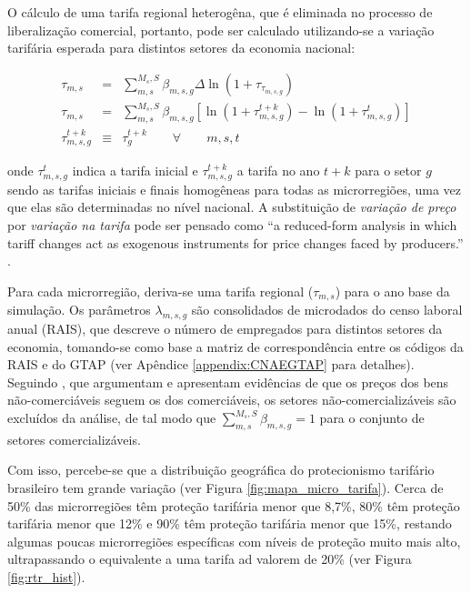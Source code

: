 \documentclass{article}
\begin{document}
O cálculo de uma tarifa regional heterogêna, que é eliminada no processo de liberalização comercial, portanto, pode ser calculado utilizando-se a variação tarifária esperada para  distintos setores da economia nacional:

\begin{eqnarray}
    \label{eq:reg_tar}
    \tau_{m,s} &=& \sum_{m,s}^{M_s,S} \beta_{m,s,g} \Delta \ln(1+\tau_\tau_{m,s,g}) \nonumber \\
    \tau_{m,s} &=& \sum_{m,s}^{M_s,S} \beta_{m,s,g} [\ln (1 + \tau_{m,s,g}^{t+k}) - \ln (1 + \tau_{m,s,g}^{t})] \\
    \tau_{m,s,g}^{t+k} &\equiv& \tau_{g}^{t+k} \qquad \forall \qquad m,s,t \nonumber 
\end{eqnarray}


onde \(\tau_{m,s,g}^{t}\) indica a tarifa inicial e \(\tau_{m,s,g}^{t+k}\) a tarifa no ano \(t+k\) para o setor $g$ \textemdash sendo as tarifas iniciais e finais homogêneas para todas as microrregiões, uma vez que elas são determinadas no nível nacional. A substituição de \emph{variação de preço} por \emph{variação na tarifa} pode ser pensado como ``a reduced-form analysis in which tariff changes act as exogenous instruments for price changes faced by producers.'' \parencite{kovak}.

Para cada microrregião, deriva-se uma tarifa regional ($\tau_{m,s}$) para o ano base da simulação. Os parâmetros $\lambda_{m,s,g}$ são consolidados de microdados do censo laboral anual (RAIS), que descreve o número de empregados para distintos setores da economia, tomando-se como base a matriz de correspondência entre os códigos da RAIS e do GTAP (ver Apêndice \ref{appendix:CNAEGTAP} para detalhes). Seguindo \textcite{dixkovak}, que argumentam e apresentam evidências de que os preços dos bens não-comerciáveis seguem os dos comerciáveis, os setores não-comercializáveis são excluídos da análise,   de tal modo que $\sum_{m,s}^{M_s,S} \beta_{m,s,g} = 1$ para o conjunto de setores comercializáveis.

Com isso, percebe-se que a distribuição geográfica do protecionismo tarifário brasileiro tem grande variação (ver Figura \ref{fig:mapa_micro_tarifa}). Cerca de 50\% das microrregiões têm proteção tarifária menor que 8,7\%, 80\% têm proteção tarifária menor que 12\% e 90\% têm proteção tarifária menor que 15\%, restando algumas poucas microrregiões específicas com níveis de proteção muito mais alto, ultrapassando o equivalente a uma tarifa ad valorem de 20\% (ver Figura \ref{fig:rtr_hist}).
\end{document}
